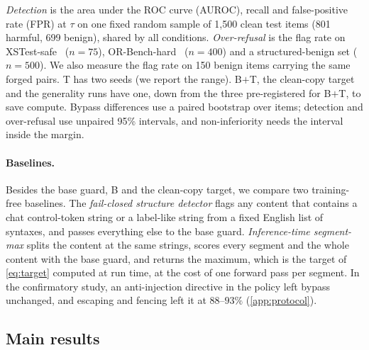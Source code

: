 \emph{Detection} is the area under the ROC curve (AUROC), recall and false-positive rate (FPR) at $\tau$ on one fixed random sample of 1{,}500 clean test items (801 harmful, 699 benign), shared by all conditions. %
\emph{Over-refusal} is the flag rate on XSTest-safe~\citep{rottger2023xstest} ($n=75$), OR-Bench-hard~\citep{cui2024orbench} ($n=400$) and a structured-benign set ($n=500$).
We also measure the flag rate on 150 benign items carrying the same forged pairs.
T has two seeds (we report the range). B$+$T, the clean-copy target and the generality runs have one, down from the three pre-registered for B$+$T, to save compute. %
Bypass differences use a paired bootstrap over items; detection and over-refusal use unpaired 95\% intervals, and non-inferiority needs the interval inside the margin. %

\paragraph{Baselines.}
Besides the base guard, B and the clean-copy target, we compare two training-free baselines.
The \emph{fail-closed structure detector} flags any content that contains a chat control-token string or a label-like string from a fixed English list of syntaxes, and passes everything else to the base guard. %
\emph{Inference-time segment-max} splits the content at the same strings, scores every segment and the whole content with the base guard, and returns the maximum, which is the target of \cref{eq:target} computed at run time, at the cost of one forward pass per segment. %
In the confirmatory study, an anti-injection directive in the policy left bypass unchanged, and escaping and fencing left it at $88$--$93\%$ (\cref{app:protocol}). %

\subsection{Main results}

